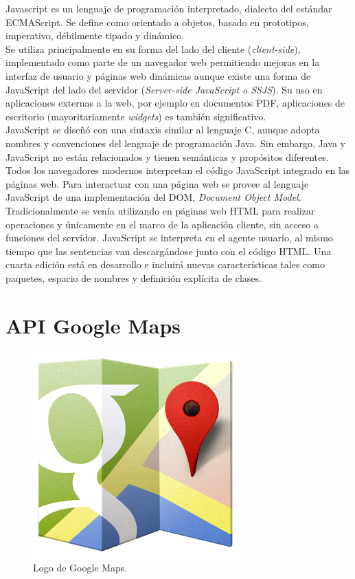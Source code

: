 Javascript es un lenguaje de programaci\'on interpretado, dialecto del est\'andar ECMAScript. Se define como orientado a objetos, basado en prototipos, imperativo, d\'ebilmente tipado y din\'amico.\\

Se utiliza principalmente en su forma del lado del cliente (\textit{client-side}), implementado como parte de un navegador web permitiendo mejoras en la interfaz de usuario y p\'aginas web din\'amicas aunque existe una forma de JavaScript del lado del servidor (\textit{Server-side JavaScript o SSJS}). Su uso en aplicaciones externas a la web, por ejemplo en documentos PDF, aplicaciones de escritorio (mayoritariamente \textit{widgets}) es tambi\'en significativo.\\

JavaScript se dise\~n\'o con una sintaxis similar al lenguaje C, aunque adopta nombres y convenciones del lenguaje de programaci\'on Java. Sin embargo, Java y JavaScript no est\'an relacionados y tienen sem\'anticas y prop\'ositos diferentes.\\

Todos los navegadores modernos interpretan el c\'odigo JavaScript integrado en las p\'aginas web. Para interactuar con una p\'agina web se provee al lenguaje JavaScript de una implementaci\'on del DOM, \textit{Document Object Model}.\\

Tradicionalmente se ven\'ia utilizando en p\'aginas web HTML para realizar operaciones y \'unicamente en el marco de la aplicaci\'on cliente, sin acceso a funciones del servidor. JavaScript se interpreta en el agente usuario, al mismo tiempo que las sentencias van descarg\'andose junto con el c\'odigo HTML. Una cuarta edici\'on est\'a en desarrollo e incluir\'a nuevas caracter\'isticas tales como paquetes, espacio de nombres y definici\'on expl\'icita de clases.\\

\section{API Google Maps}\label{SEC:Seccion4}

\begin{figure}[htbp]
    \centering
    	\includegraphics[scale=0.3]{./Figuras/apigmaps.png}
    \caption{Logo de Google Maps. }
    \label{fig:googlemaps}
\end{figure}

